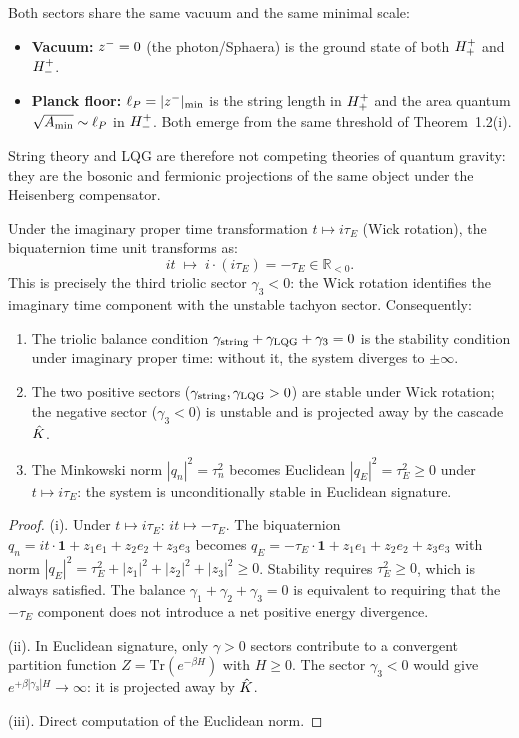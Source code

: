 \begin{proposition}
\label{prop:shared-vacuum-planck}
Both sectors share the same vacuum and the same minimal scale:
\begin{itemize}
  \item \textbf{Vacuum:} $z^-=0$ (the photon/Sphaera) is the ground
        state of both $H^+_+$ and $H^+_-$.
  \item \textbf{Planck floor:} $\ell_P=|z^-|_{\min}$ is the string
        length in $H^+_+$ and the area quantum
        $\sqrt{A_{\min}}\sim\ell_P$ in $H^+_-$.
        Both emerge from the same threshold of Theorem~1.2(i).
\end{itemize}
String theory and LQG are therefore not competing theories of quantum
gravity: they are the bosonic and fermionic projections of the same
object under the Heisenberg compensator.
\end{proposition}

\begin{theorem}\label{thm:wick}
Under the imaginary proper time transformation $t\mapsto i\tau_E$
(Wick rotation), the biquaternion time unit transforms as:
\[
  it \;\mapsto\; i\cdot(i\tau_E) = -\tau_E \in\mathbb{R}_{<0}.
\]
This is precisely the third triolic sector $\gamma_3<0$: the Wick
rotation identifies the imaginary time component with the unstable
tachyon sector.
Consequently:
\begin{enumerate}[label=(\roman*)]
  \item The triolic balance condition
        $\gamma_{\mathrm{string}}+\gamma_{\mathrm{LQG}}+\gamma_3=0$ is the stability
        condition under imaginary proper time: without it, the system
        diverges to $\pm\infty$.
  \item The two positive sectors ($\gamma_{\mathrm{string}},\gamma_{\mathrm{LQG}}>0$)
        are stable under Wick rotation; the negative sector
        ($\gamma_3<0$) is unstable and is projected away by the
        cascade $\hat{K}$.
  \item The Minkowski norm $|q_n|^2=\tau_n^2$ becomes Euclidean
        $|q_E|^2=\tau_E^2\geq 0$ under $t\mapsto i\tau_E$: the system
        is unconditionally stable in Euclidean signature.
\end{enumerate}
\begin{proof}
(i). Under $t\mapsto i\tau_E$: $it\mapsto -\tau_E$.
The biquaternion $q_n=it\cdot\mathbf{1}+z_1 e_1+z_2 e_2+z_3 e_3$ becomes
$q_E=-\tau_E\cdot\mathbf{1}+z_1 e_1+z_2 e_2+z_3 e_3$
with norm $|q_E|^2=\tau_E^2+|z_1|^2+|z_2|^2+|z_3|^2\geq 0$.
Stability requires $\tau_E^2\geq 0$, which is always satisfied.
The balance $\gamma_1+\gamma_2+\gamma_3=0$ is equivalent to requiring
that the $-\tau_E$ component does not introduce a net positive energy
divergence.

(ii). In Euclidean signature, only $\gamma>0$ sectors contribute to a
convergent partition function $Z=\mathrm{Tr}(e^{-\beta H})$ with $H\geq 0$.
The sector $\gamma_3<0$ would give $e^{+\beta|\gamma_3|H}\to\infty$:
it is projected away by $\hat{K}$.

(iii). Direct computation of the Euclidean norm.
\end{proof}
\end{theorem}

